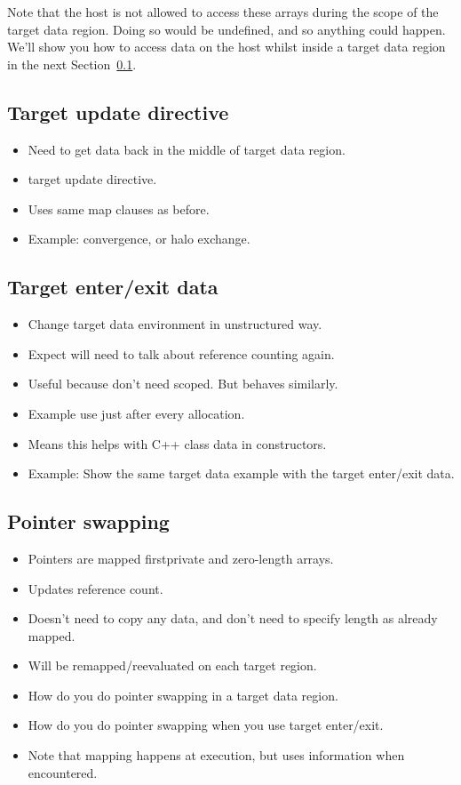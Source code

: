Note that the host is not allowed to access these arrays during the scope of the target data region.
Doing so would be undefined, and so anything could happen. We'll show you how to access data on the host whilst inside a target data region in the next Section~\ref{ssec:target_update}.


\subsection{Target update directive}
\label{ssec:target_update}
\begin{itemize}
  \item Need to get data back in the middle of target data region.
  \item target update directive.
  \item Uses same map clauses as before.
  \item Example: convergence, or halo exchange.
\end{itemize}

\subsection{Target enter/exit data}
\label{ssec:target_enter_exit_data}
\begin{itemize}
  \item Change target data environment in unstructured way.
  \item Expect will need to talk about reference counting again.
  \item Useful because don't need scoped. But behaves similarly.
  \item Example use just after every allocation.
  \item Means this helps with C++ class data in constructors.
  \item Example: Show the same target data example with the target enter/exit data.
\end{itemize}

\subsection{Pointer swapping}
\begin{itemize}
  \item Pointers are mapped firstprivate and zero-length arrays.
  \item Updates reference count.
  \item Doesn't need to copy any data, and don't need to specify length as already mapped.
  \item Will be remapped/reevaluated on each target region.
  \item How do you do pointer swapping in a target data region.
  \item How do you do pointer swapping when you use target enter/exit.
  \item Note that mapping happens at execution, but uses information when encountered.
\end{itemize}

